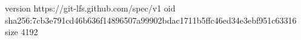 version https://git-lfs.github.com/spec/v1
oid sha256:7cb3e791cd46b636f14896507a99902bdac1711b5ffc46ed34e3ebf951c63316
size 4192
